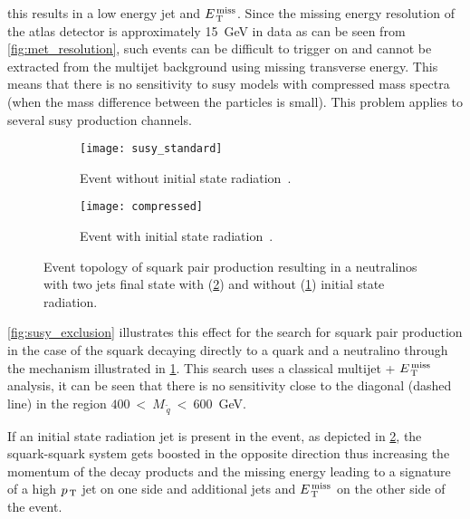 this results in a low energy jet and $E_\mathrm{\, T}^\mathrm{\, miss}$. Since the missing energy resolution
of the \gls{atlas} detector is approximately 15~GeV in data as can be seen from
\cref{fig:met_resolution}, such events can be difficult to trigger on and cannot
be extracted from the multijet background using missing transverse energy. This
means that there is no sensitivity to \gls{susy} models with compressed mass
spectra (when the mass difference between the particles is small). This problem
applies to several \gls{susy} production channels.
\begin{figure}[!h]
  \centering
  \begin{subfigure}[t]{.48\linewidth}
    \texttt{[image: susy\_standard]}
    \caption{Event without initial state radiation~\cite{SUSYPub}.}
    \label{fig:susy_standard}
  \end{subfigure} \quad
  \begin{subfigure}[t]{.48\linewidth}
    \texttt{[image: compressed]}
    \caption{Event with initial state radiation~\cite{ExotPub}.}
    \label{fig:susy_compressed}
  \end{subfigure}
  \caption{Event topology of squark pair production resulting in a neutralinos
    with two jets final state with (\cref{fig:susy_compressed}) and without
    (\cref{fig:susy_standard}) initial state radiation.}
  \label{fig:motivation}
\end{figure}

\cref{fig:susy_exclusion} illustrates this effect for the search for squark pair
production in the case of the squark decaying directly to a quark and a
neutralino through the mechanism illustrated in \cref{fig:susy_standard}. This
search uses a classical multijet + $E_\mathrm{\, T}^\mathrm{\, miss}$ analysis, it can be seen that there is
no sensitivity close to the diagonal (dashed line) in the region
$400~<~M_{\, \tilde{q}}~<~600$~GeV.

If an initial state radiation jet is present in the event, as depicted in
\cref{fig:susy_compressed}, the squark-squark system gets boosted in the
opposite direction thus increasing the momentum of the decay products and the
missing energy leading to a signature of a high $p_\mathrm{\, T}$ jet on one side and
additional jets and $E_\mathrm{\, T}^\mathrm{\, miss}$ on the other side of the event.

